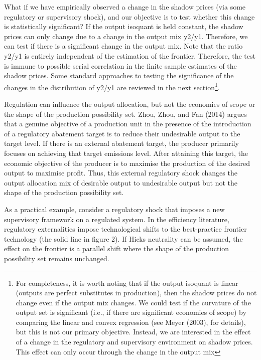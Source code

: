 \documentclass[
  10pt,
]{article}
\begin{document}
What if we have empirically observed a change in the shadow prices (via
some regulatory or supervisory shock), and our objective is to test
whether this change is statistically significant? If the output isoquant
is held constant, the shadow prices can only change due to a change in
the output mix y2/y1. Therefore, we can test if there is a significant
change in the output mix. Note that the ratio y2/y1 is entirely
independent of the estimation of the frontier. Therefore, the test is
immune to possible serial correlation in the finite sample estimates of
the shadow prices. Some standard approaches to testing the significance
of the changes in the distribution of y2/y1 are reviewed in the next
section\footnote{For completeness, it is worth noting that if the output
  isoquant is linear (outputs are perfect substitutes in production),
  then the shadow prices do not change even if the output mix changes.
  We could test if the curvature of the output set is significant (i.e.,
  if there are significant economies of scope) by comparing the linear
  and convex regression (see Meyer (2003), for details), but this is not
  our primary objective. Instead, we are interested in the effect of a
  change in the regulatory and supervisory environment on shadow prices.
  This effect can only occur through the change in the output mix}.

Regulation can influence the output allocation, but not the economies of
scope or the shape of the production possibility set. Zhou, Zhou, and
Fan (2014) argues that a genuine objective of a production unit in the
presence of the introduction of a regulatory abatement target is to
reduce their undesirable output to the target level. If there is an
external abatement target, the producer primarily focuses on achieving
that target emissions level. After attaining this target, the economic
objective of the producer is to maximise the production of the desired
output to maximise profit. Thus, this external regulatory shock changes
the output allocation mix of desirable output to undesirable output but
not the shape of the production possibility set.

As a practical example, consider a regulatory shock that imposes a new
supervisory framework on a regulated system. In the efficiency
literature, regulatory externalities impose technological shifts to the
best-practice frontier technology (the solid line in figure 2). If Hicks
neutrality can be assumed, the effect on the frontier is a parallel
shift where the shape of the production possibility set remains
unchanged.
\end{document}
